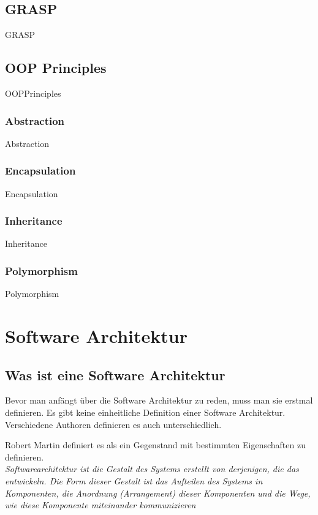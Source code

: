 \documentclass{article}
\begin{document}
    \subsection{GRASP}
        {GRASP}

    \subsection{OOP Principles}
        {OOPPrinciples}

        \subsubsection{Abstraction}
            {Abstraction}

        \subsubsection{Encapsulation}
            {Encapsulation}

        \subsubsection{Inheritance}
            {Inheritance}

        \subsubsection{Polymorphism}
            {Polymorphism}

\newpage

\section{Software Architektur}
    \subsection{Was ist eine Software Architektur}

    Bevor man anfängt über die Software Architektur zu reden, muss man sie erstmal definieren.
    Es gibt keine einheitliche Definition einer Software Architektur. Verschiedene Authoren definieren es auch unterschiedlich.

    Robert Martin definiert es als ein Gegenstand mit bestimmten Eigenschaften zu definieren.\\
    \textit{Softwarearchitektur ist die Gestalt des Systems erstellt von derjenigen, die das entwickeln. 
    Die Form dieser Gestalt ist das Aufteilen des Systems in Komponenten, die Anordnung (Arrangement) dieser Komponenten und die Wege, 
    wie diese Komponente miteinander kommunizieren} \cite[136]{cleanArchitecture}
    
\end{document}
